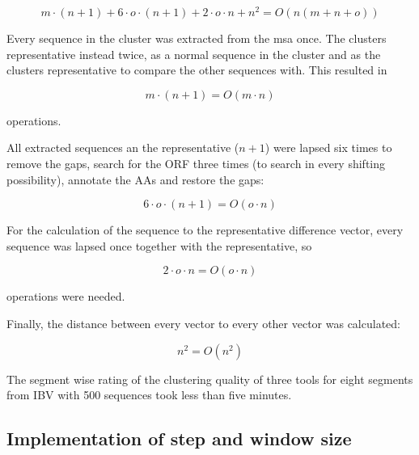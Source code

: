     \[ m \cdot (n + 1) + 6 \cdot o \cdot ( n + 1 ) + 2 \cdot o \cdot n + n^2 = O(n(m+n+o))\]
    
    Every sequence in the cluster was extracted from the \gls{msa} once. The clusters representative instead twice, as a normal sequence in the cluster and as the clusters representative to compare the other sequences with. This resulted in
    
    \[ m \cdot (n + 1) = O(m\cdot n) \]
    
    operations. 
    
    All extracted sequences an the representative ($n+1$) were lapsed six times to remove the gaps, search for the \gls{ORF} three times (to search in every shifting possibility), annotate the \glspl{AA} and restore the gaps:
    
    \[ 6 \cdot o \cdot (n + 1) = O(o\cdot n) \]
    
    For the calculation of the sequence to the representative difference vector, every sequence was lapsed once together with the representative, so
    
    \[ 2\cdot o \cdot n = O(o\cdot n) \]
    
    operations were needed.
    
    Finally, the distance between every vector to every other vector was calculated:
    
    \[ n^2 = O(n^2) \]
    
    The segment wise rating of the clustering quality of three tools for eight segments from \gls{IBV} with 500 sequences took less than five minutes.
    
    \subsection{Implementation of step and window size}

